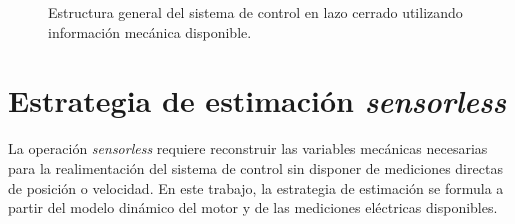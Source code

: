 \begin{figure}[htbp]

    \caption{Estructura general del sistema de control en lazo cerrado
    utilizando información mecánica disponible.}
    \label{fig:estructura_control_lazo_cerrado}

\end{figure}


\section{Estrategia de estimación \textit{sensorless}}
\label{sec:estrategia_sensorless}

La operación \textit{sensorless} requiere reconstruir las variables
mecánicas necesarias para la realimentación del sistema de control sin
disponer de mediciones directas de posición o velocidad. En este
trabajo, la estrategia de estimación se formula a partir del modelo
dinámico del motor y de las mediciones eléctricas disponibles.

